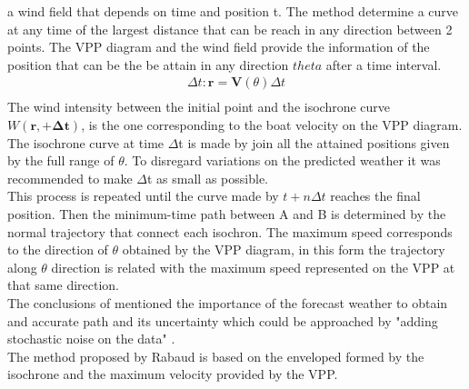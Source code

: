 a wind field that depends on time and position t\bm{$)$}. The method determine a curve at any time of the largest distance that can be reach in any direction between 2 points. The VPP diagram and the wind field provide the information of the position that can be the be attain in any direction $theta$ after a time interval. \\
\begin{equation}
\label{reach_position}
\begin{aligned}
\Delta t: \bm{r} =\bm{V}(\theta) \Delta t \\
\end{aligned}
\end{equation}
The wind intensity between the initial point and the isochrone curve $W(\bm{r,+ \Delta t})$,  is the one corresponding to the boat velocity on the VPP diagram.
The isochrone curve at time $\Delta$t is made by join all the attained positions given by the full range of $\theta$. %
To disregard variations on the predicted weather it was recommended to make $\Delta$t as small as possible.\\
This process is repeated until the curve made by  $\textit{t}+n\Delta t$ reaches the final position. Then the minimum-time path between A and B is determined by the normal trajectory that connect each isochron. The maximum speed corresponds to the direction of $\theta$ obtained by the VPP diagram, in this form the trajectory along $\theta$ direction is related with the maximum speed represented on the VPP at that same direction. \\   The conclusions of \cite{rabaudoptimal} mentioned the importance of the forecast weather to obtain and accurate path and its uncertainty  which could be approached by "adding stochastic noise on the data" \cite{rabaudoptimal} . 
\\
The method proposed by Rabaud \cite{rabaudoptimal} is based on the enveloped formed by the isochrone and the maximum velocity provided by the VPP. 
